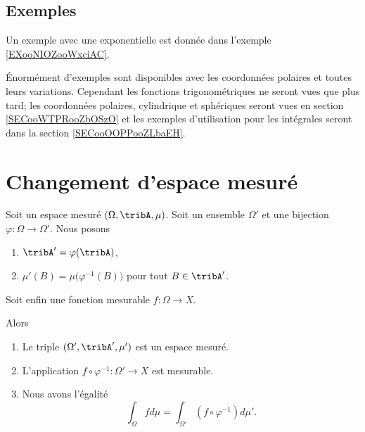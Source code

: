 \subsection{Exemples}

Un exemple avec une exponentielle est donnée dans l'exemple \ref{EXooNIOZooWxciAC}.

Énormément d'exemples sont disponibles avec les coordonnées polaires et toutes leurs variations. Cependant les fonctions trigonométriques ne seront vues que plus tard; les coordonnées polaires, cylindrique et sphériques seront vues en section \ref{SECooWTPRooZbOSzO} et les exemples d'utilisation pour les intégrales seront dans la section \ref{SECooOOPPooZLbaEH}.

\section{Changement d'espace mesuré}

\begin{proposition}      \label{PROPooILOEooBiumKD}
    Soit un espace mesuré \( (\Omega,\tribA,\mu)\). Soit un ensemble \( \Omega'\) et une bijection \( \varphi\colon \Omega\to \Omega'\). Nous posons
    \begin{enumerate}
        \item
            \( \tribA'=\varphi(\tribA)\),
        \item
            \( \mu'(B)=\mu\big( \varphi^{-1}(B) \big)\) pour tout \( B\in\tribA'\).
    \end{enumerate}
    Soit enfin une fonction mesurable \( f\colon \Omega\to X\).

    Alors
    \begin{enumerate}
        \item
            Le triple \( (\Omega',\tribA',\mu')\) est un espace mesuré.
        \item
            L'application \( f\circ\varphi^{-1}\colon \Omega'\to X\) est mesurable.
        \item
            Nous avons l'égalité
            \begin{equation}
                \int_{\Omega}fd\mu=\int_{\Omega'}(f\circ\varphi^{-1})d\mu'.
            \end{equation}
    \end{enumerate}
\end{proposition}

